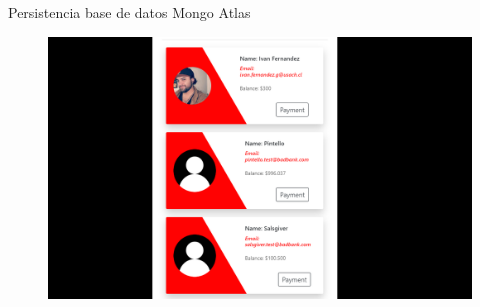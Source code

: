 \documentclass[xcolor=pdftex,dvipsnames,table]{beamer}
\begin{document}
\begin{frame}{Persistencia base de datos Mongo Atlas}
    \begin{figure}[htb]
        \centering
        \captionsetup{justification=centering,margin=0.3cm}
        \includegraphics[width=1\linewidth]{func/representaciondedatos.png}
    \end{figure}
\end{frame}
\end{document}

